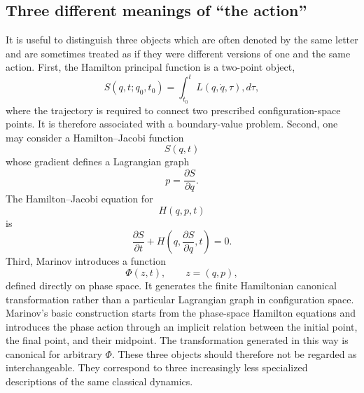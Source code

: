 \subsection{Three different meanings of ``the action''}
It is useful to distinguish three objects which are often denoted by the same
letter and are sometimes treated as if they were different versions of one
and the same action.
First, the Hamilton principal function is a two-point object,
\begin{equation}
S(q,t;q_0,t_0)=\int_{t_0}^{t} L(q,\dot q,\tau),d\tau ,
\end{equation}
where the trajectory is required to connect two prescribed configuration-space
points.  It is therefore associated with a boundary-value problem.
Second, one may consider a Hamilton--Jacobi function
\begin{equation}
S(q,t)
\end{equation}
whose gradient defines a Lagrangian graph
\begin{equation}
p=\frac{\partial S}{\partial q}.
\end{equation}
The Hamilton--Jacobi equation for
\begin{equation}
H(q,p,t)
\end{equation}
is
\begin{equation}
\frac{\partial S}{\partial t}
+
H\left(q,\frac{\partial S}{\partial q},t\right)=0.
\label{HJ}
\end{equation}
Third, Marinov introduces a function
\begin{equation}
\Phi(z,t),\qquad z=(q,p),
\end{equation}
defined directly on phase space.  It generates the finite Hamiltonian
canonical transformation rather than a particular Lagrangian graph in
configuration space.  Marinov's basic construction starts from the phase-space
Hamilton equations and introduces the phase action through an implicit
relation between the initial point, the final point, and their midpoint.
The transformation generated in this way is canonical for arbitrary
\(\Phi\). \cite{Marinov1979}
These three objects should therefore not be regarded as interchangeable.
They correspond to three increasingly less specialized descriptions of the
same classical dynamics.
